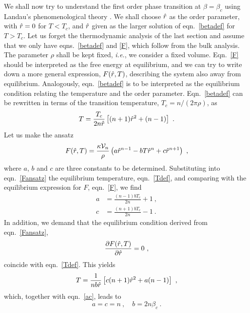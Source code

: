 \documentclass[a4paper,12pt]{article}
\begin{document}
We shall now try to understand the first order phase transition at
$\beta=\beta_c$ using Landau's phenomenological theory
\cite{Landau9}. We shall choose $\hat{r}$
as the order parameter, with $\hat{r}=0$ for $T<T_c$, and $\hat{r}$ given as
the larger solution of eqn.\ \eqref{betadef} for $T>T_c$. Let us
forget the thermodynamic analysis of the last section
and assume that we only have eqns.\ \eqref{betadef} and \eqref{F}, which
follow from the bulk analysis. The parameter $\rho$ shall be kept
fixed, \emph{i.e.}, we consider a fixed volume.
Eqn.\ \eqref{F} should be interpreted as the free energy at
equilibrium, and we can try to write down a more general expression,
$F(\hat{r},T)$, describing the system also away from
equilibrium. Analogously, eqn.\ \eqref{betadef} is to be interpreted
as the equilibrium condition relating the temperature and the order
parameter. Eqn.\ \eqref{betadef} can be rewritten in terms of the
transition temperature, $T_c=n/(2\pi\rho)$, as
\begin{equation}
\label{Tdef}
  T = \frac{T_c}{2n\hat{r}} \left[(n+1) \hat{r}^2 +(n-1) \right]~.
\end{equation}
Let us make the ansatz
\begin{equation}
\label{Fansatz}
  F(\hat{r},T) = \frac{\kappa \mathcal{V}_n}{\rho} \left( a \hat{r}^{n-1} - bT \hat{r}^n +c
  \hat{r}^{n+1} \right)~,
\end{equation}
where $a$, $b$ and $c$ are three constants to be
determined. Substituting into eqn.\ \eqref{Fansatz} the equilibrium
temperature, eqn.\ \eqref{Tdef}, and comparing with
the equilibrium expression for $F$, eqn.\ \eqref{F}, we find
\begin{equation}
\label{ac}
\begin{split}
  a &= \frac{(n-1)bT_c}{2n}+1~,\\
  c &= \frac{(n+1)bT_c}{2n}-1~.
\end{split}
\end{equation}
In addition, we demand that the equilibrium
condition derived from eqn.\ \eqref{Fansatz},
\begin{equation}
\label{eqcond}
  \frac{\partial F(\hat{r},T)}{\partial \hat{r}} =0~,
\end{equation}
coincide with eqn.\ \eqref{Tdef}. This yields
\begin{equation}
\label{eqcond2}
  T = \frac{1}{nb\hat{r}} \left[c(n+1) \hat{r}^2 +a(n-1) \right]~,
\end{equation}
which, together with eqn.\ \eqref{ac}, leads to
\begin{equation}
\label{abc}
  a=c=n~, \quad  b=2n \beta_c~.
\end{equation}
\end{document}
